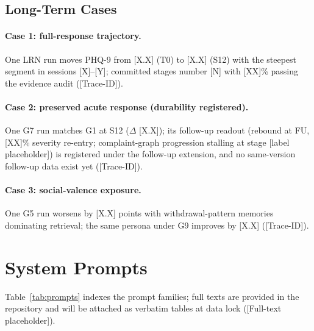 \documentclass[10pt]{article}
\begin{document}
\subsection{Long-Term Cases}

\paragraph{Case 1: full-response trajectory.}
One LRN run moves PHQ-9 from [X.X] (T0) to [X.X] (S12) with the steepest segment in sessions [X]--[Y]; committed stages number [N] with [XX]\% passing the evidence audit ([Trace-ID]).
\paragraph{Case 2: preserved acute response (durability registered).}
One G7 run matches G1 at S12 ($\Delta$ [X.X]); its follow-up readout (rebound at FU, [XX]\% severity re-entry; complaint-graph progression stalling at stage [label placeholder]) is registered under the follow-up extension, and no same-version follow-up data exist yet ([Trace-ID]).
\paragraph{Case 3: social-valence exposure.}
One G5 run worsens by [X.X] points with withdrawal-pattern memories dominating retrieval; the same persona under G9 improves by [X.X] ([Trace-ID]).

\section{System Prompts}\label{app:prompts}

Table~\ref{tab:prompts} indexes the prompt families; full texts are provided in the repository and will be attached as verbatim tables at data lock ([Full-text placeholder]).
\end{document}
